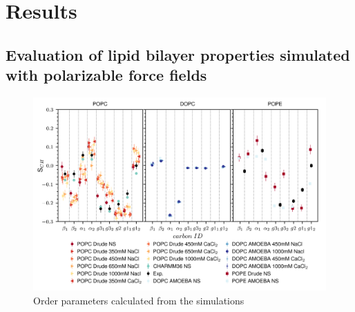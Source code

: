 \documentclass[journal=jacsat,manuscript=article,layout=singlecolumn]{achemso}
\begin{document}
\section{Results}

\subsection{Evaluation of lipid bilayer properties simulated with polarizable force fields}



\begin{figure}[!hbt]
    \centering
    \includegraphics{Figures/order_parameters.png}
    \caption{Order parameters calculated from the simulations}
    \label{fig:order_parameters}
\end{figure}
\end{document}
